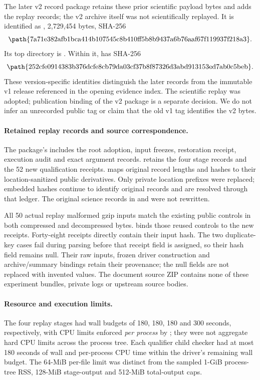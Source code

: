 The later v2 record package retains these prior scientific payload bytes
and adds the replay records; the v2 archive itself was not scientifically
replayed. It is identified as
,
2,729,454 bytes, SHA-256
\[
\text{\path{7a71e382afb1bca414b107545c8b410ff5b8b9437a6b76aaf67f119937f218a3}} .
\]
Its top directory is .
Within it,  has SHA-256
\[
\text{\path{252cfe0914383b376dcfe8cb79da03cf37b8f87326d3abd913153ed7ab0c5beb}} .
\]
These version-specific identities distinguish the later records from the
immutable v1 release referenced in the opening evidence index.
The scientific replay was adopted; publication binding of the v2 package
is a separate decision. We do not infer an unrecorded public tag or claim
that the old v1 tag identifies the v2 bytes.

\paragraph{Retained replay records and source correspondence.}
The package's  includes the root adoption, input
freezes, restoration receipt, execution audit and exact argument records.
 retains the four stage records and the 52 new
qualification receipts.
 maps original record lengths
and hashes to their location-sanitized public derivatives.
Only private location prefixes were replaced; embedded hashes continue
to identify original records and are resolved through that ledger.
The original science records in  and  were not rewritten.

All 50 actual replay malformed gzip inputs match the existing public
controls in both compressed and decompressed bytes.
 binds those reused controls
to the new receipts. Forty-eight receipts directly contain their input hash.
The two duplicate-key cases fail during parsing before that receipt field
is assigned, so their hash field remains null. Their raw inputs, frozen
driver construction and archive/summary bindings retain their provenance;
the null fields are not replaced with invented values.
The document source ZIP contains none of these experiment bundles,
private logs or upstream source bodies.

\paragraph{Resource and execution limits.}
The four replay stages had wall budgets of 180, 180, 180 and 300 seconds,
respectively, with CPU limits enforced \emph{per process} by
; they were not aggregate hard CPU limits across the
process tree.
Each qualifier child checker had at most 180 seconds of wall and
per-process CPU time within the driver's remaining wall budget.
The 64-MiB per-file limit was distinct from the sampled 1-GiB process-tree
RSS, 128-MiB stage-output and 512-MiB total-output caps.

